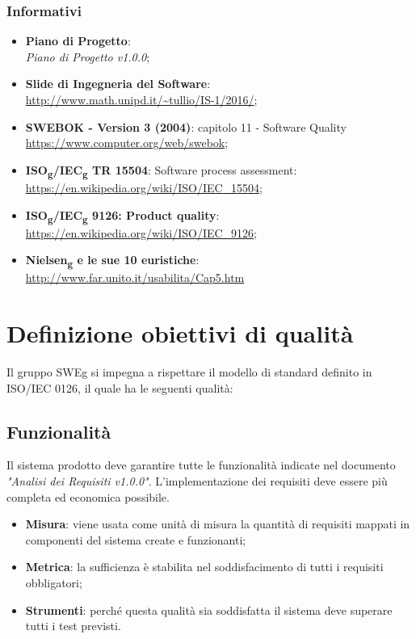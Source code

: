 \documentclass[12pt,a4paper,titlepage]{article}
\begin{document}
	\subsubsection{Informativi}
	\begin{itemize}
		\item \textbf{Piano di Progetto}:\\
		\textit{Piano di Progetto v1.0.0};
		\item \textbf{Slide di Ingegneria del Software}:\\ 
			\textcolor{blue}{\url{http://www.math.unipd.it/~tullio/IS-1/2016/}};
		\item \textbf{SWEBOK - Version 3 (2004)}: capitolo 11 - Software Quality\\
			\textcolor{blue}{\url{https://www.computer.org/web/swebok}};
		\item \textbf{ISO\textsubscript{g}/IEC\textsubscript{g} TR 15504}: Software process assessment:\\
			\textcolor{blue}{\url{https://en.wikipedia.org/wiki/ISO/IEC_15504}};
		\item \textbf{ISO\textsubscript{g}/IEC\textsubscript{g} 9126: Product quality}:\\
			\textcolor{blue}{\url{https://en.wikipedia.org/wiki/ISO/IEC_9126}};
		\item \textbf{Nielsen\textsubscript{g} e le sue 10 euristiche}: \\
			\textcolor{blue}{\url{http://www.far.unito.it/usabilita/Cap5.htm}}
	\end{itemize} 
	
	\newpage
	\section{Definizione obiettivi di qualità}
	Il gruppo SWEg si impegna a rispettare il modello di standard definito in ISO/IEC 0126, il quale ha le seguenti qualità:
		\subsection{Funzionalità}
		Il sistema prodotto deve garantire tutte le funzionalità indicate nel documento \textit{"Analisi dei Requisiti v1.0.0"}. L'implementazione dei requisiti deve essere più completa ed economica possibile.
		\begin{itemize}
			\item \textbf{Misura}: viene usata come unità di misura la quantità di requisiti mappati in componenti del sistema create e funzionanti;
			\item \textbf{Metrica}: la sufficienza è stabilita nel soddisfacimento di tutti i requisiti obbligatori;
			\item \textbf{Strumenti}: perché questa qualità sia soddisfatta il sistema deve superare tutti i test previsti.
		\end{itemize}
	
\end{document}
